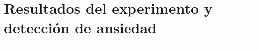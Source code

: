 
\chapter{Resultados del experimento y detecci\'on de ansiedad}\label{capit:cap4}
\vspace{-2.0325ex}%
\noindent
\rule{\textwidth}{0.5pt}
\vspace{-5.5ex}%
\newcommand{\pushline}{\Indp}%






